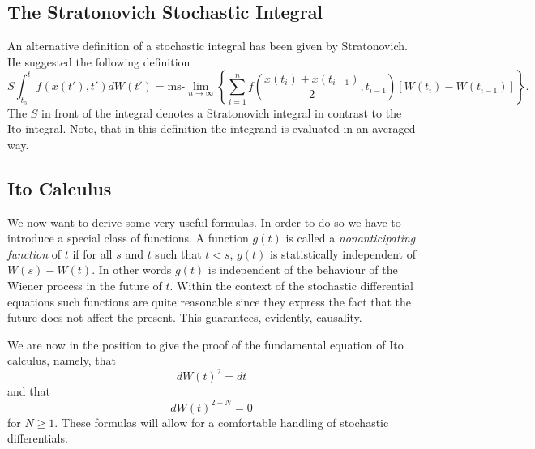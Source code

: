 \subsection{The Stratonovich Stochastic Integral}
\label{STRATONOVICHSUB}
An alternative definition of a stochastic  integral has been given by
Stratonovich. He suggested the following definition
\begin{equation}
\label{STRATONOVICHDEFI}
S\int_{t_0}^t f(x(t'),t') dW(t') = \text{ms-}\lim_{n \rightarrow \infty}
   \left\{ \sum_{i=1}^{n} f( \frac{x(t_{i})+ x(t_{i-1})}{2}, t_{i-1}) 
[W(t_i) - W(t_{i-1})]   \right\}.
\end{equation}
The $S$ in front of the integral denotes a Stratonovich integral
in contrast to the Ito integral.
Note, that in this definition the integrand is evaluated in an
averaged way.

\subsection{Ito Calculus}
We now want to derive some very useful formulas. In order to do so 
we have to introduce a special class of functions. A function $g(t)$
is called a {\em nonanticipating function} of $t$ if for all
$s$ and $t$ such that $t<s$, $g(t)$ is statistically independent 
of $W(s)-W(t)$. In other words $g(t)$ is independent of the 
behaviour of the Wiener process in the future of $t$. Within the 
context of the stochastic differential equations such functions 
are quite reasonable since they express the fact that the future 
does not affect the present. This guarantees, evidently, 
causality.

We are now in the position to give the proof of the fundamental 
equation of Ito calculus, namely, that
\begin{equation*}
dW(t)^2 = dt 
\end{equation*}
and that
\begin{equation*}
dW(t)^{2+N} =0 
\end{equation*}
for $N \ge 1$. These formulas will allow for a comfortable 
handling of stochastic differentials.


